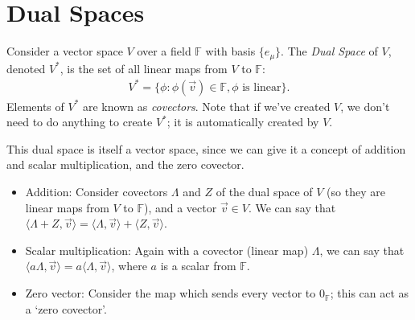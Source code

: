 \chapter{Dual Spaces}
Consider a vector space $V$ over a field $\mathbb{F}$ with basis $\{e_\mu\}$.
The \emph{Dual Space} of $V$, denoted $V^*$, is the set of all linear maps from $V$ to $\mathbb{F}$:
\begin{align*}
    V^* = \{\phi : \phi(\vec{v}) \in \mathbb{F}, \phi \text{ is linear}\}.
\end{align*}
Elements of $V^*$ are known as \emph{covectors}. Note that if we've created $V$, we don't need to do anything to create $V^*$; it is automatically created by $V$.

This dual space is itself a vector space, since we can give it a concept of addition and scalar multiplication, and the zero covector.
\begin{itemize}
    \item Addition: Consider covectors $\Lambda$ and $Z$ of the dual space of $V$ (so they are linear maps from $V$ to $\mathbb{F}$), and a vector $\vec{v} \in V$. We can say that $\langle \Lambda + Z, \vec{v} \rangle = \langle \Lambda,\vec{v} \rangle + \langle Z, \vec{v} \rangle$.
    \item Scalar multiplication: Again with a covector (linear map) $\Lambda$, we can say that $\langle a\Lambda, \vec{v} \rangle = a\langle \Lambda, \vec{v} \rangle$, where $a$ is a scalar from $\mathbb{F}$.
    \item Zero vector: Consider the map which sends every vector to $0_\mathbb{F}$; this can act as a `zero covector'.
\end{itemize}

